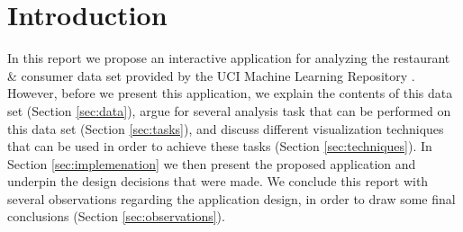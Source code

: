 \section{Introduction}\label{sec:intro}
In this report we propose an interactive application for analyzing the restaurant \& consumer data set provided by the UCI Machine Learning Repository \cite{WinNT}. However, before we present this application, we explain the contents of this data set (Section \ref{sec:data}), argue for several analysis task that can be performed on this data set (Section \ref{sec:tasks}), and discuss different visualization techniques that can be used in order to achieve these tasks (Section \ref{sec:techniques}). In Section \ref{sec:implemenation} we then present the proposed application and underpin the design decisions that were made. We conclude this report with several observations regarding the application design, in order to draw some final conclusions (Section \ref{sec:observations}). 